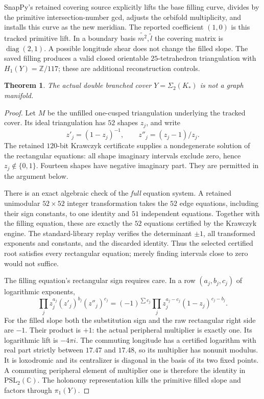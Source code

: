 \documentclass[11pt]{article}
\newtheorem{theorem}{Theorem}
\begin{document}
SnapPy's retained covering source explicitly lifts the base filling
curve, divides by the primitive intersection-number gcd, adjusts the
orbifold multiplicity, and installs this curve as the new meridian.
The reported coefficient $(1,0)$ is this tracked primitive lift.
In a boundary basis $\widetilde{m^2},\widetilde l$ the covering matrix
is $\operatorname{diag}(2,1)$. A possible longitude shear does not
change the filled slope. The saved filling produces a valid closed
orientable $25$-tetrahedron triangulation with $H_1(Y)=\mathbb Z/117$;
these are additional reconstruction controls.

\begin{theorem}\label{thm:nongraph}
The actual double branched cover $Y=\Sigma_2(K_*)$ is not a graph
manifold.
\end{theorem}
\begin{proof}
Let $M$ be the unfilled one-cusped triangulation underlying the
tracked cover. Its ideal triangulation has $52$ shapes $z_j$, and
write
\[
                    z'_j=(1-z_j)^{-1},\qquad z''_j=(z_j-1)/z_j.
\]
The retained $120$-bit Krawczyk certificate supplies a nondegenerate
solution of the rectangular equations: all shape imaginary intervals
exclude zero, hence $z_j\notin\{0,1\}$. Fourteen shapes have negative
imaginary part. They are permitted in the argument below.

There is an exact algebraic check of the \emph{full} equation system.
A retained unimodular $52\times52$ integer transformation takes the
$52$ edge equations, including their sign constants, to one identity
and $51$ independent equations. Together with the filling equation,
these are exactly the $52$ equations certified by the Krawczyk engine.
The standard-library replay verifies the determinant $\pm1$, all
transformed exponents and constants, and the discarded identity.
Thus the selected certified root satisfies every rectangular equation;
merely finding intervals close to zero would not suffice.

The filling equation's rectangular sign requires care. In a row
$(a_j,b_j,c_j)$ of logarithmic exponents,
\[
 \prod_j z_j^{a_j}(z'_j)^{b_j}(z''_j)^{c_j}
   =(-1)^{\sum c_j}\prod_j z_j^{a_j-c_j}(1-z_j)^{c_j-b_j}.
\]
For the filled slope both the substitution sign and the raw rectangular
right side are $-1$. Their product is $+1$: the actual peripheral
multiplier is exactly one. Its logarithmic lift is $-4\pi i$.
The commuting longitude has a certified logarithm with real part
strictly between $17.47$ and $17.48$, so its multiplier has nonunit
modulus. It is loxodromic and its centralizer is diagonal in the basis
of its two fixed points. A commuting peripheral element of multiplier
one is therefore the identity in $\mathrm{PSL}_2(\mathbb C)$.
The holonomy representation kills the primitive filled slope and
factors through $\pi_1(Y)$.


\end{proof}
\end{document}
